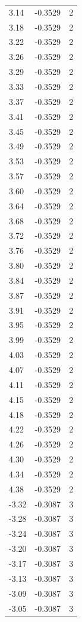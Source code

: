 \begin{longtable}{lrr}
  3.14 & -0.3529 & 2 \\
  3.18 & -0.3529 & 2 \\
  3.22 & -0.3529 & 2 \\
  3.26 & -0.3529 & 2 \\
  3.29 & -0.3529 & 2 \\
  3.33 & -0.3529 & 2 \\
  3.37 & -0.3529 & 2 \\
  3.41 & -0.3529 & 2 \\
  3.45 & -0.3529 & 2 \\
  3.49 & -0.3529 & 2 \\
  3.53 & -0.3529 & 2 \\
  3.57 & -0.3529 & 2 \\
  3.60 & -0.3529 & 2 \\
  3.64 & -0.3529 & 2 \\
  3.68 & -0.3529 & 2 \\
  3.72 & -0.3529 & 2 \\
  3.76 & -0.3529 & 2 \\
  3.80 & -0.3529 & 2 \\
  3.84 & -0.3529 & 2 \\
  3.87 & -0.3529 & 2 \\
  3.91 & -0.3529 & 2 \\
  3.95 & -0.3529 & 2 \\
  3.99 & -0.3529 & 2 \\
  4.03 & -0.3529 & 2 \\
  4.07 & -0.3529 & 2 \\
  4.11 & -0.3529 & 2 \\
  4.15 & -0.3529 & 2 \\
  4.18 & -0.3529 & 2 \\
  4.22 & -0.3529 & 2 \\
  4.26 & -0.3529 & 2 \\
  4.30 & -0.3529 & 2 \\
  4.34 & -0.3529 & 2 \\
  4.38 & -0.3529 & 2 \\
  -3.32 & -0.3087 & 3 \\
  -3.28 & -0.3087 & 3 \\
  -3.24 & -0.3087 & 3 \\
  -3.20 & -0.3087 & 3 \\
  -3.17 & -0.3087 & 3 \\
  -3.13 & -0.3087 & 3 \\
  -3.09 & -0.3087 & 3 \\
  -3.05 & -0.3087 & 3 \\

\end{longtable}
